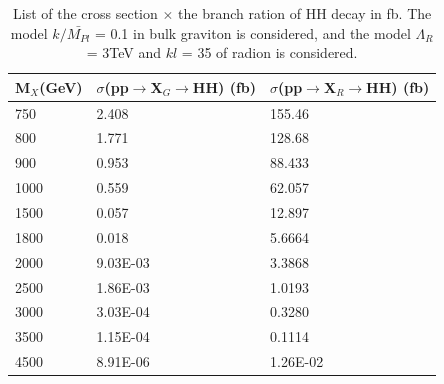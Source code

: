 
\begin{table}[h!]
  \begin{center}
    \begin{tabular}{l|l|l}
    M$_{X}$(GeV) &  $\sigma$(pp$\rightarrow$X$_{G}\rightarrow $HH) (fb)& $\sigma$(pp$\rightarrow$X$_{R}\rightarrow $HH) (fb)\\
    \hline
    750 & 2.408 & 155.46 \\
    800 & 1.771 & 128.68 \\
    900 & 0.953 & 88.433\\
    1000 & 0.559 & 62.057\\
    1500 & 0.057 & 12.897\\
    1800 & 0.018 & 5.6664\\
    2000 & 9.03E-03 & 3.3868\\
    2500 & 1.86E-03 & 1.0193\\
    3000 & 3.03E-04 & 0.3280\\
    3500 & 1.15E-04 & 0.1114\\
    4500 & 8.91E-06 & 1.26E-02\\
	\hline
    \end{tabular}
  \end{center}

  \caption{List of the cross section $\times$ the branch ration of HH decay in fb. The model $k/\bar{M_{Pl}}$ = 0.1 in bulk graviton is considered, and the model $	\Lambda _R$ = 3TeV and $kl$ = 35 of radion is considered.}
\end{table}



